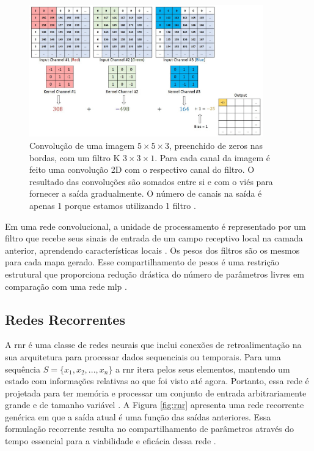 \begin{figure}[h]
	\centering
	\includegraphics[width=0.9\textwidth]{figuras/conv3D.pdf}
	\caption[Convolução 2D em três mapas de recursos.]{Convolução de uma imagem  $5 \times 5 \times 3$, preenchido de zeros nas bordas, com um filtro K $3 \times 3 \times 1$. Para cada canal da imagem é feito uma convolução 2D com o respectivo canal do filtro. O resultado das convoluções são somados entre si e com o viés para fornecer a saída gradualmente.  O número de canais na saída é apenas 1 porque estamos utilizando 1 filtro \cite{sumit}.}
	\label{fig:con3d}
\end{figure}


Em uma rede convolucional, a unidade de processamento é representado por um filtro que recebe seus sinais de entrada de um campo receptivo local na camada anterior, aprendendo características locais \cite[272]{Haykin}. Os pesos dos filtros são os mesmos para cada mapa gerado. Esse compartilhamento de pesos é uma restrição estrutural que proporciona redução drástica do número de parâmetros livres em comparação com uma rede \acrshort{mlp} \cite[272]{Haykin}. 




\subsection{Redes Recorrentes}

A \gls{rnr} \cite{rumelhart1986learning} é uma classe de redes neurais que inclui conexões de retroalimentação na sua arquitetura para processar dados sequenciais ou temporais. Para uma sequência $S = \{x_1,x_2,...,x_n\}$ a \acrshort{rnr} itera pelos seus elementos, mantendo um estado com informações relativas ao que foi visto até agora. Portanto, essa rede é projetada para ter memória \cite{FrancoisDeepLearning} e processar um conjunto de entrada arbitrariamente grande e de tamanho variável \cite{ketkar2017deep}.
A Figura \ref{fig:rnr} apresenta uma rede recorrente genérica em que a saída atual é uma função das saídas anteriores.  Essa formulação recorrente resulta no compartilhamento de parâmetros através do tempo essencial para a viabilidade e eficácia dessa rede \cite{Goodfellow2016}.

